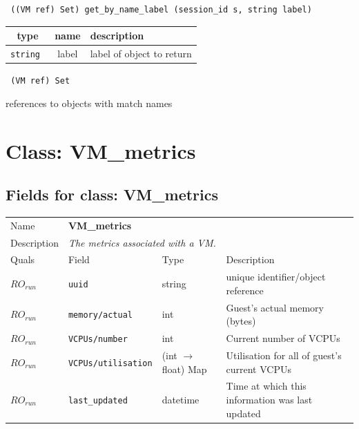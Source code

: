 \begin{verbatim} ((VM ref) Set) get_by_name_label (session_id s, string label)\end{verbatim}



 
\vspace{0.3cm}
\begin{tabular}{|c|c|p{7cm}|}
 \hline
{\bf type} & {\bf name} & {\bf description} \\ \hline
{\tt string } & label & label of object to return \\ \hline 

\end{tabular}

\vspace{0.3cm}

{\tt 
(VM ref) Set
}


references to objects with match names
\vspace{0.3cm}
\vspace{0.3cm}
\vspace{0.3cm}

\vspace{1cm}
\newpage
\section{Class: VM\_metrics}
\subsection{Fields for class: VM\_metrics}
\begin{longtable}{|lllp{}|}
\hline
\multicolumn{1}{|l}{Name} & \multicolumn{3}{l|}{\bf VM\_metrics} \\
\multicolumn{1}{|l}{Description} & \multicolumn{3}{l|}{\parbox{11cm}{\em
The metrics associated with a VM.}} \\
\hline
Quals & Field & Type & Description \\
\hline
$\mathit{RO}_\mathit{run}$ &  {\tt uuid} & string & unique identifier/object reference \\
$\mathit{RO}_\mathit{run}$ &  {\tt memory/actual} & int & Guest's actual memory (bytes) \\
$\mathit{RO}_\mathit{run}$ &  {\tt VCPUs/number} & int & Current number of VCPUs \\
$\mathit{RO}_\mathit{run}$ &  {\tt VCPUs/utilisation} & (int $\rightarrow$ float) Map & Utilisation for all of guest's current VCPUs \\
$\mathit{RO}_\mathit{run}$ &  {\tt last\_updated} & datetime & Time at which this information was last updated \\
\hline
\end{longtable}
